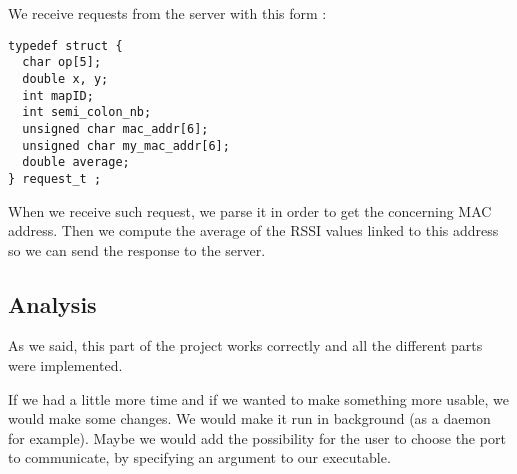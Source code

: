 We receive requests from the server with this form :

\begin{lstlisting}
typedef struct {
  char op[5];
  double x, y;
  int mapID;
  int semi_colon_nb;
  unsigned char mac_addr[6];
  unsigned char my_mac_addr[6];
  double average;
} request_t ;
\end{lstlisting}

When we receive such request, we parse it in order to get the concerning MAC
address. Then we compute the average of the RSSI values linked to this address
so we can send the response to the server.

\subsection{Analysis}

As we said, this part of the project works correctly and all the different
parts were implemented. 

If we had a little more time and if we wanted to make something more usable, we
would make some changes. We would make it run in background (as a daemon for
example). Maybe we would add the possibility for the user to choose the port to
communicate, by specifying an argument to our executable.






